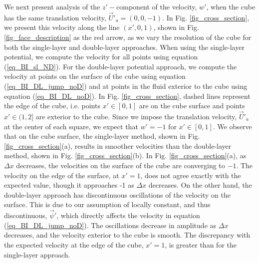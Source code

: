 We next present analysis of the $z'-$component of the velocity, $w'$, when the cube has the same translation velocity, $\vec{U}'_a = (0,0,-1)$.
In Fig. \ref{fig_cross_section}, we present this velocity along the line $(x',0,1)$,  shown in Fig. \ref{fig_face_description} as the red arrow, 
as we vary the resolution of the cube for both the single-layer and double-layer approaches.
When using the single-layer potential, we 
compute the velocity for all points using equation (\ref{eq_BI_sl_ND}). For the double-layer potential approach, we 
compute the velocity at points on the surface of the cube using equation (\ref{eq_BI_DL_jump_noD})  and at points in the fluid exterior to the cube using equation  (\ref{eq_BI_DL_noD}).
In Fig. \ref{fig_cross_section}, dashed lines represent the edge of the cube,  i.e. points $x' \in [0,1]$ are on the cube surface and points $x' \in (1,2]$ are exterior to the cube. Since we impose the translation velocity, $\vec{U}'_{a}$ at the center of each square, we expect that $w'= -1$ for $x' \in [0,1]$.
We observe that on the cube surface, the single-layer method, shown in Fig. \ref{fig_cross_section}(a), results in smoother velocities than the double-layer method, shown in  Fig. \ref{fig_cross_section}(b).
In Fig. \ref{fig_cross_section}(a), as $\Delta x$ decreases, the velocities on the surface of the cube are converging to $-1$. The velocity on the edge of the surface, at $x' = 1$, does not agree exactly with the expected value, though it approaches -1  as $\Delta x$ decreases.  On the other hand, the double-layer approach has discontinuous oscillations of the velocity on the surface. This is due to our assumption of locally constant, and thus discontinuous, $\vec{\psi}'$, which directly affects the velocity in equation (\ref{eq_BI_DL_jump_noD}).  The oscillations decrease in amplitude as $\Delta x$ decreases, and the velocity exterior to the cube is smooth. The discrepancy with the expected velocity at the edge of the cube, $x' =1$, is greater than for the single-layer approach.

